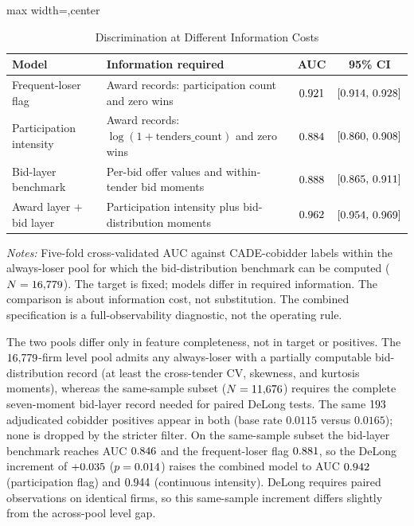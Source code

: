\begin{table}[htbp]
\centering
\caption{Discrimination at Different Information Costs}
\label{tab:imhof_cost_submission}
\footnotesize
\begin{adjustbox}{max width=\textwidth,center}
\begin{threeparttable}
\begin{tabular}{p{4.6cm}p{5.4cm}cc}
\toprule
Model & Information required & AUC & 95\% CI \\
\midrule
Frequent-loser flag & Award records: participation count and zero wins
& $0.921$ & $[0.914,\,0.928]$ \\
Participation intensity & Award records: $\log(1+\text{tenders\_count})$ and zero wins
& $0.884$ & $[0.860,\,0.908]$ \\
Bid-layer benchmark & Per-bid offer values and within-tender bid moments
& $0.888$ & $[0.865,\,0.911]$ \\
Award layer $+$ bid layer & Participation intensity plus bid-distribution moments
& $0.962$ & $[0.954,\,0.969]$ \\
\bottomrule
\end{tabular}
\begin{tablenotes}
\footnotesize
\item \textit{Notes:} Five-fold cross-validated AUC against
CADE-cobidder labels within the always-loser pool for which the
bid-distribution benchmark can be computed
($N=16{,}779$). The target is fixed; models differ in
required information. The comparison is about information cost,
not substitution. The combined specification is a
full-observability diagnostic, not the operating rule.
\item The two pools differ only in feature completeness, not in
target or positives. The $16{,}779$-firm level pool admits
any always-loser with a partially computable bid-distribution
record (at least the cross-tender CV, skewness, and kurtosis
moments), whereas the same-sample subset
($N=11{,}676$) requires the complete seven-moment
bid-layer record needed for paired DeLong tests. The same
$193$ adjudicated cobidder positives appear in both
(base rate $0.0115$ versus $0.0165$); none is dropped by the
stricter filter. On the same-sample subset the bid-layer
benchmark reaches AUC $0.846$ and the frequent-loser
flag $0.881$, so the DeLong increment of
$+0.035$ ($p=0.014$) raises the combined model
to AUC $0.942$ (participation flag) and
$0.944$ (continuous intensity). DeLong requires
paired observations on identical firms, so this same-sample
increment differs slightly from the across-pool level gap.
\end{tablenotes}
\end{threeparttable}
\end{adjustbox}
\end{table}

